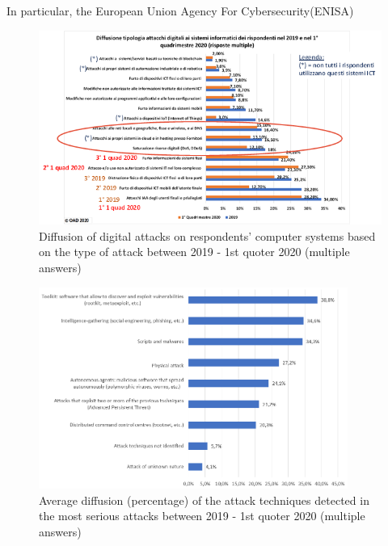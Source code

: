\documentclass{easychair}
\begin{document}
In particular, the European Union Agency For Cybersecurity(ENISA)

\begin{figure}
	\centering
		\includegraphics[width=1\textwidth]{pictures/fig5.png}
		\caption{Diffusion of digital attacks on respondents' computer systems based on the type of attack between 2019 - 1st quoter 2020 (multiple answers) \cite{oad20}}
		\label{fig:5}
\end{figure}
\begin{figure}
	\centering
		\includegraphics[width=0.90\textwidth]{pictures/fig6.png}
		\caption{Average diffusion (percentage) of the attack techniques detected in the most serious attacks between 2019 - 1st quoter 2020 (multiple answers) \cite{oad20}}
		\label{fig:6}
\end{figure}
\end{document}
